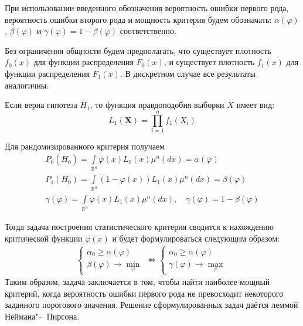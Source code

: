 \begin{rmrk}
При использовании введенного обозначения вероятность ошибки первого рода, вероятность ошибки второго рода и мощность критерия будем обозначать: $\alpha(\varphi)$, $\beta(\varphi)$ и $\gamma(\varphi)=1-\beta(\varphi)$ соответственно.
\end{rmrk}

Без ограничения общности будем предполагать, что существует плотность $f_{0}(x)$ для функции распределения $F_{0}(x)$, и существует плотность $f_{1}(x)$ для функции распределения $F_{1}(x)$. В дискретном случае все результаты аналогичны.

Если верна гипотеза $H_1$, то функция правдоподобия выборки $X$ имеет вид:
\begin{equation*}
    L_{1}\left(\mathbf{X}\right)=\prod_{i=1}^{n} f_{1}\left(X_{i}\right)
\end{equation*}

Для рандомизированного критерия получаем
\begin{gather*}
    P_{0}\left(\overline{H}_{0}\right)=\int\limits_{\mathbb{R}^{n}} \varphi(x) L_{0}(x) \mu^{n}(d x)=\alpha(\varphi) \\
    P_{1}\left(H_{0}\right)=\int\limits_{\mathbb{R}^{n}}(1-\varphi(x)) L_{1}(x) \mu^{n}(d x)=\beta(\varphi) \\
    \gamma(\varphi)=\int\limits_{\mathbb{R}^{n}} \varphi(x) L_{1}(x) \mu^{n}(d x), \quad \gamma(\varphi)=1-\beta(\varphi)
\end{gather*}

Тогда задача построения статистического критерия сводится к нахождению критической функции $\varphi(x)$ и будет формулироваться следующим образом:
\begin{equation*}
    \begin{array}{l}
    \left\{\begin{array}{l}
    \alpha_{0} \geqslant \alpha(\varphi) \\
    \beta(\varphi) \rightarrow \min\limits_{\varphi}
    \end{array}\right.
    \Leftrightarrow
    \left\{\begin{array}{l}
    \alpha_{0} \geqslant \alpha(\varphi) \\
    \gamma(\varphi) \rightarrow \max\limits_{\varphi}
    \end{array}\right.
    \end{array}
\end{equation*}
Таким образом, задача заключается в том, чтобы найти наиболее мощный критерий, когда вероятность ошибки первого рода не превосходит некоторого заданного порогового значения. Решение сформулированных задач даётся леммой Неймана"--~Пирсона.

